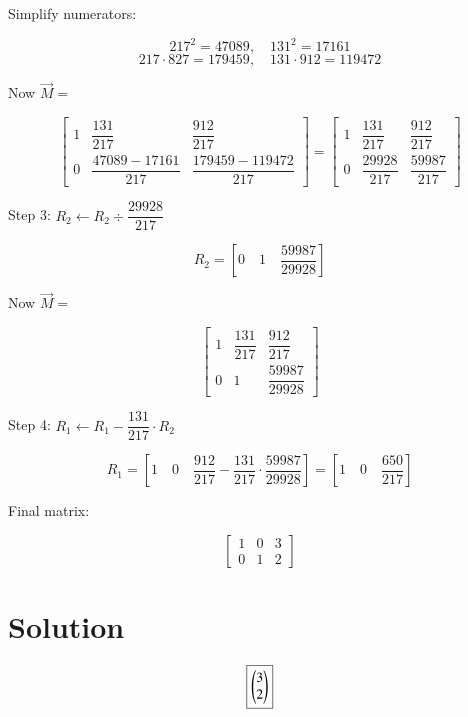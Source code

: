 \documentclass[journal]{IEEEtran}
\begin{document}
\vspace{0.3cm}
Simplify numerators:

\[
217^2 = 47089, \quad 131^2 = 17161
\]
\[
217 \cdot 827 = 179459, \quad 131 \cdot 912 = 119472
\]

\vspace{0.3cm}
Now \( \vec{M} = \)

\[
\left[
\begin{array}{ccc}
1 & \dfrac{131}{217} & \dfrac{912}{217} \\
0 & \dfrac{47089 - 17161}{217} & \dfrac{179459 - 119472}{217}
\end{array}
\right]
=
\left[
\begin{array}{ccc}
1 & \dfrac{131}{217} & \dfrac{912}{217} \\
0 & \dfrac{29928}{217} & \dfrac{59987}{217}
\end{array}
\right]
\]

\vspace{0.4cm}
Step 3: \( R_2 \leftarrow R_2 \div \dfrac{29928}{217} \)

\[
R_2 =
\left[
0 \quad 1 \quad \dfrac{59987}{29928}
\right]
\]

\vspace{0.3cm}
Now \( \vec{M} = \)

\[
\left[
\begin{array}{ccc}
1 & \dfrac{131}{217} & \dfrac{912}{217} \\
0 & 1 & \dfrac{59987}{29928}
\end{array}
\right]
\]

\vspace{0.4cm}
Step 4: \( R_1 \leftarrow R_1 - \dfrac{131}{217} \cdot R_2 \)

\[
R_1 =
\left[
1 \quad 0 \quad \dfrac{912}{217} - \dfrac{131}{217} \cdot \dfrac{59987}{29928}
\right]
=
\left[
1 \quad 0 \quad \dfrac{650}{217}
\right]
\]

\vspace{0.4cm}
Final matrix:

\[
\left[
\begin{array}{ccc}
1 & 0 & 3 \\
0 & 1 & 2
\end{array}
\right]
\]

\vspace{0.4cm}
\section*{\large\textbf{Solution}}

\[
\boxed{
\begin{pmatrix}3 \\ 2\end{pmatrix}
}
\]
\end{document}
